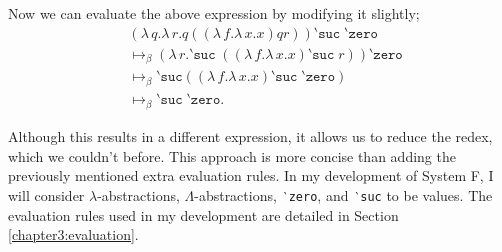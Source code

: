 Now we can evaluate the above expression by modifying it slightly;
\begin{align*}
  &(\lambda \, q. \lambda \, r. q ((\lambda \, f. \lambda \, x . x) q r))
    \texttt{‵suc} \;\texttt{‵zero}\\
  &\mapsto_{\beta} (
      \lambda \, r. \texttt{‵suc} \; ((\lambda \, f. \lambda \, x . x) \texttt{‵suc} \; r)
    )
    \texttt{‵zero}\\
  &\mapsto_{\beta} \texttt{‵suc} ((\lambda \, f. \lambda \, x . x) \texttt{‵suc} \; \texttt{‵zero})\\
  &\mapsto_{\beta} \texttt{‵suc} \; \texttt{‵zero}.
\end{align*}

Although this results in a different expression, it allows us to reduce the redex, which we couldn't
before. This approach is more concise than adding the previously mentioned extra evaluation rules.
In my development of System F, I will consider $\lambda$-abstractions, $\Lambda$-abstractions,
\texttt{‵zero}, and \texttt{‵suc} to be values. The evaluation rules used in my development are
detailed in Section \ref{chapter3:evaluation}.
